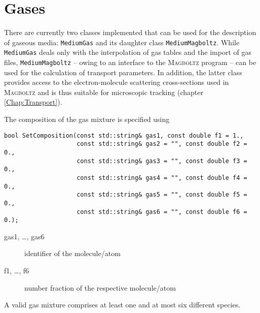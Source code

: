 
\section{Gases}

There are currently two classes implemented that can be used for the 
description of gaseous media: \texttt{MediumGas} and its 
daughter class \texttt{MediumMagboltz}. 
While \texttt{MediumGas} deals only with the interpolation of gas tables 
and the import of gas files, 
\texttt{MediumMagboltz} -- owing to an interface to the 
\textsc{Magboltz} program \cite{Biagi1999} -- 
can be used for the calculation of transport parameters. 
In addition, the latter class provides access to the 
electron-molecule scattering cross-sections used in \textsc{Magboltz} and is 
thus suitable for microscopic tracking (chapter \ref{Chap:Transport}). 

The composition of the gas mixture is specified using
\begin{lstlisting}
bool SetComposition(const std::string& gas1, const double f1 = 1.,
                    const std::string& gas2 = "", const double f2 = 0.,
                    const std::string& gas3 = "", const double f3 = 0.,
                    const std::string& gas4 = "", const double f4 = 0.,
                    const std::string& gas5 = "", const double f5 = 0.,
                    const std::string& gas6 = "", const double f6 = 0.);
\end{lstlisting}
\begin{description}
  \item[gas1, \dots, gas6] identifier of the molecule/atom
  \item[f1, \dots, f6] number fraction of the respective molecule/atom
\end{description}
A valid gas mixture comprises at least one and at most six 
different species. 

